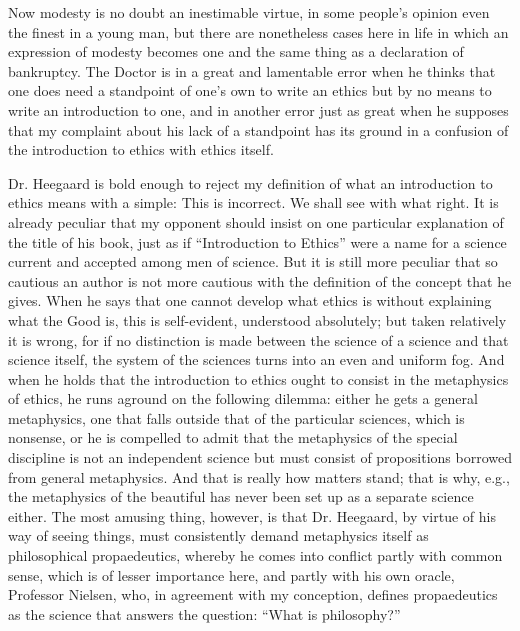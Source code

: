 \documentclass[12pt,a4paper,openany]{book}
\newcommand{\opage}[1]{\marginnote{\footnotesize\textit{[#1]}}}
\begin{document}
Now modesty is no doubt an inestimable virtue, in some people's
opinion even the finest in a young man, but there are nonetheless
cases here in life in which an expression of modesty becomes one
and the same thing as a declaration of bankruptcy. The Doctor is in
a great and lamentable error when he thinks that one does need a
standpoint of one's own to write an ethics but by no means to write
an introduction to one, and in another error just as great when he
supposes that my complaint about his lack of a standpoint has its
ground in a confusion of the introduction to ethics with ethics
itself.

Dr. Heegaard is bold enough to reject my definition
\opage{37}of what an introduction to ethics means with a simple: This is
incorrect. We shall see with what right. It is already peculiar that
my opponent should insist on one particular explanation of the title
of his book, just as if ``Introduction to Ethics'' were a name for a
science current and accepted among men of science. But it is still
more peculiar that so cautious an author is not more cautious with
the definition of the concept that he gives. When he says that one
cannot develop what ethics is without explaining what the Good is,
this is self-evident, understood absolutely; but taken relatively it
is wrong, for if no distinction is made between the science of a
science and that science itself, the system of the sciences turns
into an even and uniform fog. And when he holds that the
introduction to ethics ought to consist in the metaphysics of
ethics, he runs aground on the following dilemma: either he gets a
general metaphysics, one that falls outside that of the particular
sciences, which is nonsense, or he is compelled to admit that the
metaphysics of the special discipline is not an independent science
but must consist of propositions borrowed from general metaphysics.
And that is really how matters stand; that is why, e.g., the
metaphysics of the beautiful has never been set up as a separate
science either. The most amusing thing, however, is that Dr.
Heegaard, by virtue of his way of seeing things, must consistently
demand metaphysics itself as philosophical propaedeutics, whereby he
comes into conflict partly with common sense, which is of lesser
importance here, and partly with his own oracle, Professor Nielsen,
who, in agreement with my conception, defines propaedeutics as the
science that answers the question: ``What is philosophy?''
\end{document}
